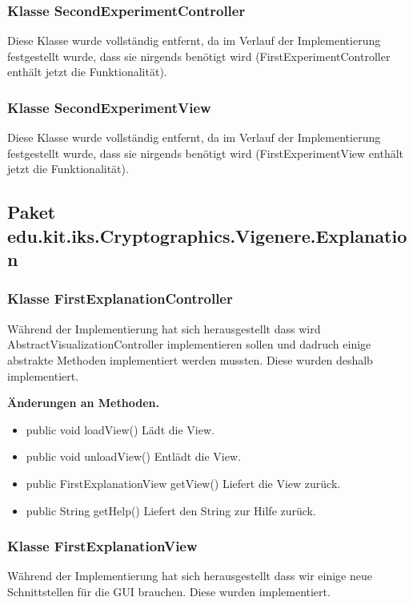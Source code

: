 \documentclass{article}
\begin{document}
    \subsubsection{Klasse SecondExperimentController}
	Diese Klasse wurde vollständig entfernt, da im Verlauf der Implementierung festgestellt wurde,
	dass sie nirgends benötigt wird (FirstExperimentController enthält jetzt die Funktionalität).
	
    \subsubsection{Klasse SecondExperimentView}
	Diese Klasse wurde vollständig entfernt, da im Verlauf der Implementierung festgestellt wurde,
	dass sie nirgends benötigt wird (FirstExperimentView enthält jetzt die Funktionalität).
  \subsection{Paket edu.kit.iks.Cryptographics.Vigenere.Explanation}
    \subsubsection{Klasse FirstExplanationController}
	Während der Implementierung hat sich herausgestellt dass wird AbstractVisualizationController implementieren sollen und dadruch 
	einige abstrakte Methoden implementiert werden mussten. Diese wurden deshalb implementiert.\newline
           
    \textbf{Änderungen an Methoden.}
      \begin{itemize}
		\item public void loadView()\newline
              Lädt die View.
        \item public void unloadView()\newline
              Entlädt die View.
        \item public FirstExplanationView getView()\newline
              Liefert die View zurück.
        \item public String getHelp()\newline
              Liefert den String zur Hilfe zurück.
      \end{itemize}
	  
    \subsubsection{Klasse FirstExplanationView}
	Während der Implementierung hat sich herausgestellt dass wir einige neue Schnittstellen für die GUI brauchen. Diese wurden implementiert.\newline
           
\end{document}
